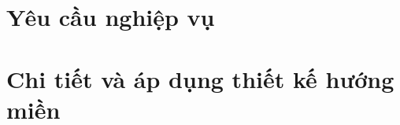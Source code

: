 \documentclass{article} %
\begin{document}
% 


% 


% 


\section{Yêu cầu nghiệp vụ}

% 


% 


% 



% 


\section{Chi tiết và áp dụng thiết kế hướng miền}
\end{document}
